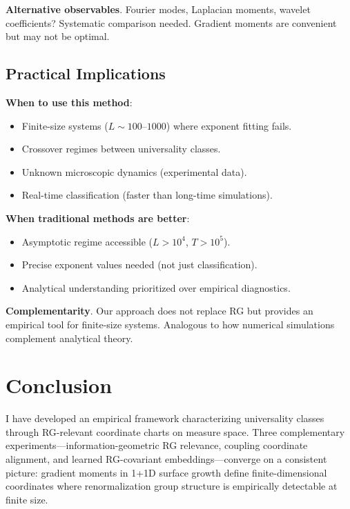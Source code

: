 \documentclass[aps,pre,reprint,amsmath,amssymb,superscriptaddress]{revtex4-2}
\begin{document}
\textbf{Alternative observables}. Fourier modes, Laplacian moments, wavelet coefficients? Systematic comparison needed. Gradient moments are convenient but may not be optimal.

\subsection{Practical Implications}

\textbf{When to use this method}:
\begin{itemize}
\item Finite-size systems ($L \sim 100$--$1000$) where exponent fitting fails.
\item Crossover regimes between universality classes.
\item Unknown microscopic dynamics (experimental data).
\item Real-time classification (faster than long-time simulations).
\end{itemize}

\textbf{When traditional methods are better}:
\begin{itemize}
\item Asymptotic regime accessible ($L > 10^4$, $T > 10^5$).
\item Precise exponent values needed (not just classification).
\item Analytical understanding prioritized over empirical diagnostics.
\end{itemize}

\textbf{Complementarity}. Our approach does not replace RG but provides an empirical tool for finite-size systems. Analogous to how numerical simulations complement analytical theory.

\section{Conclusion}
\label{sec:conclusion}

I have developed an empirical framework characterizing universality classes through RG-relevant coordinate charts on measure space. Three complementary experiments---information-geometric RG relevance, coupling coordinate alignment, and learned RG-covariant embeddings---converge on a consistent picture: gradient moments in 1+1D surface growth define finite-dimensional coordinates where renormalization group structure is empirically detectable at finite size.
\end{document}
